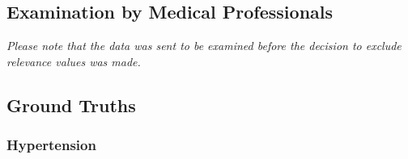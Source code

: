 \documentclass[bs, english]{stthesis}
\begin{document}
\subsection{Examination by Medical Professionals}
\label{sec:excel}
\textit{Please note that the data was sent to be examined before the decision to exclude relevance values was made.}





\subsection{Ground Truths}

\subsubsection*{Hypertension}
\end{document}
